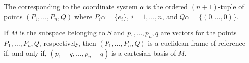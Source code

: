 The  corresponding to the coordinate system $\alpha$ is the ordered $(n+1)$-tuple of points $(P_1, \ldots, P_n, Q)$ where $P_i\alpha = \{e_i\}$, $i = 1, \ldots, n$, and $Q\alpha = \{(0, \ldots, 0)\}$.

If $M$ is the subspace belonging to $S$ and $p_1, \ldots, p_n, q$ are vectors for the points $P_1, \ldots, P_n, Q$, respectively, then $(P_1, \ldots, P_n, Q)$ is a euclidean frame of reference if, and only if, $(p_1 - q, \ldots, p_n - q)$ is a cartesian basis of $M$.
